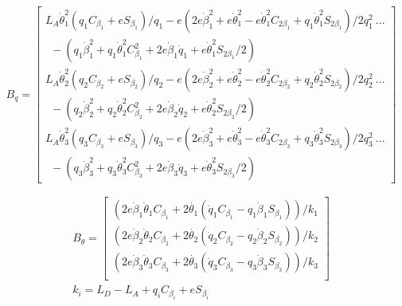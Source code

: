\begin{equation}
    B_{q} = \left[ \begin{array}{c}
        L_A\dot{\theta}_1^2\left(q_{1}C_{\beta_1} + eS_{\beta_1}\right)/q_{1}
        - e\left(2e\dot{\beta}_1^2 + e\dot{\theta}_1^2 - e\dot{\theta}_1^2C_{2\beta_1} + q_{1}\dot{\theta}_1^2S_{2\beta_1}\right)/2q_{1}^2 ~...\\
        ~~-\left(q_{1}\dot{\beta}_1^2 + q_{1}\dot{\theta}_1^2C_{\beta_1}^2 + 2e\dot{\beta}_1\dot{q}_1 + e\dot{\theta}_1^2S_{2\beta_1}/2\right) \\
        L_A\dot{\theta}_2^2\left(q_{2}C_{\beta_2} + eS_{\beta_2}\right)/q_{2}
        - e\left(2e\dot{\beta}_2^2 + e\dot{\theta}_2^2 - e\dot{\theta}_2^2C_{2\beta_2} + q_{2}\dot{\theta}_2^2S_{2\beta_2}\right)/2q_{2}^2 ~...\\
        ~~-\left(q_{2}\dot{\beta}_2^2 + q_{2}\dot{\theta}_2^2C_{\beta_2}^2 + 2e\dot{\beta}_2\dot{q}_2 + e\dot{\theta}_2^2S_{2\beta_2}/2\right) \\
        L_A\dot{\theta}_3^2\left(q_{3}C_{\beta_3} + eS_{\beta_3}\right)/q_{3}
        - e\left(2e\dot{\beta}_3^2 + e\dot{\theta}_3^2 - e\dot{\theta}_3^2C_{2\beta_3} + q_{3}\dot{\theta}_3^2S_{2\beta_3}\right)/2q_{3}^2 ~...\\
        ~~-\left(q_{3}\dot{\beta}_3^2 + q_{3}\dot{\theta}_3^2C_{\beta_3}^2 + 2e\dot{\beta}_3\dot{q}_3 + e\dot{\theta}_3^2S_{2\beta_3}/2\right)
    \end{array} \right]
\end{equation}

\begin{subequations}
    \begin{eqnarray}
        B_{\theta} = \left[ \begin{array}{c}
            \left( 2e\dot{\beta}_1\dot{\theta}_1C_{\beta_1} + 2\dot{\theta_1} \left( \dot{q}_1C_{\beta_1} - q_{1}\dot{\beta}_1S_{\beta_1}\right) \right)/k_1 \\
            \left( 2e\dot{\beta}_2\dot{\theta}_2C_{\beta_2} + 2\dot{\theta_2} \left( \dot{q}_2C_{\beta_2} - q_{2}\dot{\beta}_2S_{\beta_2}\right) \right)/k_2 \\
            \left( 2e\dot{\beta}_3\dot{\theta}_3C_{\beta_3} + 2\dot{\theta_3} \left( \dot{q}_3C_{\beta_3} - q_{3}\dot{\beta}_3S_{\beta_3}\right) \right)/k_3 \\
        \end{array} \right] \\
        k_i = L_D - L_A + q_i C_{\beta_i} + eS_{\beta_i}
    \end{eqnarray}
\end{subequations}

